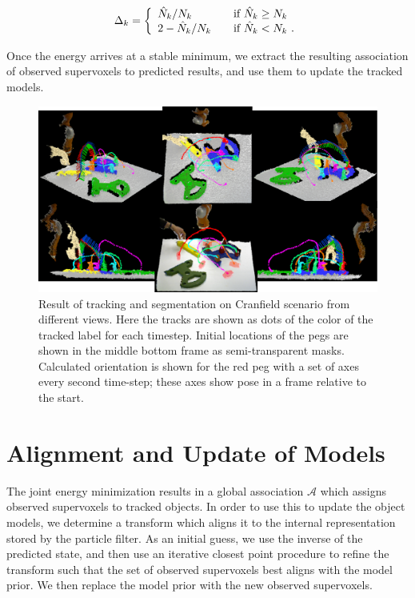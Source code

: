 \begin{equation}
\label{eqn:DeltaSVs}
\Delta_k = \left\{ 
  \begin{array}{l l}
    {\hat{N}_k}/{N_k} & \quad \text{if ${\hat{N}_k} \geq {{N}_k}$ }\\
    2 - {\hat{N}_k}/{N_k} & \quad \text{if $\hat{N}_k < {N}_k$}~. 
  \end{array} \right.  
\end{equation}

Once the energy arrives at a stable minimum, we extract the resulting association of observed supervoxels to predicted results, and use them to update the tracked models.

\begin{figure}[!ht]
  \centering
  \includegraphics[scale=0.94]{figures/IROS2013/TrajectoriesNew.pdf}
  \caption[Cranfield Tracking Results]{Result of tracking and segmentation on Cranfield scenario from different views. Here the tracks are shown as dots of the color of the tracked label for each timestep. Initial locations of the pegs are shown in the middle bottom frame as semi-transparent masks. Calculated orientation is shown for the red peg with a set of axes every second time-step; these axes show pose in a frame relative to the start. }
  \label{fig:Trajectories}
\end{figure}

\section{Alignment and Update of Models}
The joint energy minimization results in a global association $\mathcal{A}$ which assigns observed supervoxels to tracked objects. In order to use this to update the object models, we determine a transform which aligns it to the internal representation stored by the particle filter. As an initial guess, we use the inverse of the predicted state, and then use an iterative closest point \cite{ICPChetverikov} procedure to refine the transform such that the set of observed supervoxels best aligns with the model prior. We then replace the model prior with the new observed supervoxels. 

